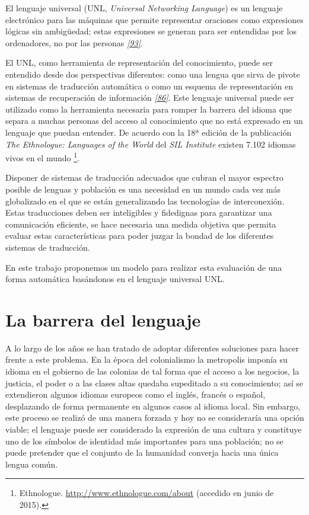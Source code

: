 \documentclass[a4paper,12pt,spanish]{book}
\begin{document}
El lenguaje universal (UNL, \emph{Universal Networking Language}) es un lenguaje
electrónico para las máquinas que permite representar oraciones como expresiones
lógicas sin ambigüedad; estas expresiones se generan para ser entendidas por
los ordenadores, no por las personas \label{0.intro:id1}{\hyperref[zreferences:uchida1999]{\emph{{[}93{]}}}}.

El UNL, como herramienta de representación del conocimiento, puede ser entendido
desde dos perspectivas diferentes: como una lengua que sirva de pivote en sistemas
de traducción automática o como un esquema de representación en sistemas de
recuperación de información \label{0.intro:id2}{\hyperref[zreferences:teixeiramartins2005]{\emph{{[}86{]}}}}. Este
lenguaje universal puede ser utilizado como la herramienta necesaria para romper
la barrera del idioma que separa a muchas personas del acceso al conocimiento que
no está expresado en un lenguaje que puedan entender. De acuerdo con la 18ª edición
de la publicación \emph{The Ethnologue: Languages of the World} del \emph{SIL Institute}
existen 7.102 idiomas vivos en el mundo \footnote{
Ethnologue. \href{http://www.ethnologue.com/about}{http://www.ethnologue.com/about} (accedido en junio de 2015).
}.

Disponer de sistemas de traducción adecuados que cubran el mayor espectro posible
de lenguas y población es una necesidad en un mundo cada vez más globalizado en el
que se están generalizando las tecnologías de interconexión. Estas traducciones
deben ser inteligibles y fidedignas para garantizar una comunicación eficiente, se
hace necesaria una medida objetiva que permita evaluar estas características para
poder juzgar la bondad de los diferentes sistemas de traducción.

En este trabajo proponemos un modelo para realizar esta evaluación de una forma
automática basándonos en el lenguaje universal UNL.


\section{La barrera del lenguaje}
\label{0.intro:la-barrera-del-lenguaje}
A lo largo de los años se han tratado de adoptar diferentes soluciones para hacer
frente a este problema. En la época del colonialismo la metropolis imponía su idioma
en el gobierno de las colonias de tal forma que el acceso a los negocios, la
justicia, el poder o a las clases altas quedaba supeditado a su conocimiento;
así se extendieron algunos idiomas europeos como el inglés, francés o español,
desplazando de forma permanente en algunos casos al idioma local. Sin embargo, este
proceso se realizó de una manera forzada y hoy no se consideraría una opción viable; el
lenguaje puede ser considerado la expresión de una cultura y constituye uno de los
símbolos de identidad más importantes para una población; no se puede pretender que
el conjunto de la humanidad converja hacia una única lengua común.
\end{document}
